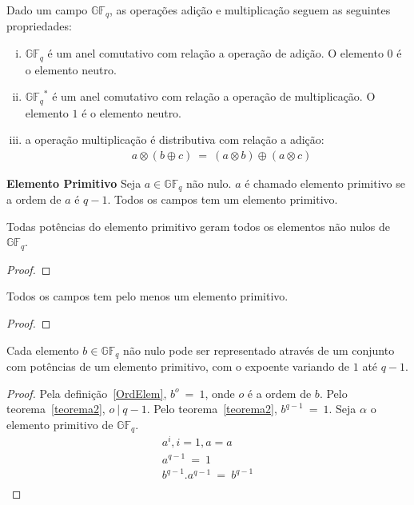 \begin{definition} 
Dado um campo $\mathbb{GF}_q$, as operações adição e multiplicação seguem as seguintes propriedades:
\begin{enumerate}[(i)]
   \item $\mathbb{GF}_q$ é um anel comutativo com relação a operação de adição. O elemento $0$ é o elemento neutro.
   \item ${\mathbb{GF}_q}^*$ é um anel comutativo com relação a operação de multiplicação. O elemento $1$ é o elemento neutro.
   \item a operação multiplicação é distributiva com relação a adição:
      \begin{align*}
         & a \otimes (b \oplus c)\ =\ (a \otimes b) \oplus (a \otimes c)
      \end{align*}
\end{enumerate}
\end{definition}

\begin{definition} {\bf Elemento Primitivo} \label{ElemPrim}  Seja $a \in \mathbb{GF}_q$ não nulo. $a$ é chamado elemento primitivo se a ordem de $a$ é $q-1$. Todos os campos tem um elemento primitivo.
\end{definition}

\begin{proposition} Todas potências do elemento primitivo geram todos os elementos não nulos de $\mathbb{GF}_q$. 
\end{proposition}

\begin{proof}
\end{proof}

\begin{proposition} Todos os campos tem pelo menos um elemento primitivo.
\end{proposition}

\begin{proof}
\end{proof}

\begin{proposition}  Cada elemento $b \in \mathbb{GF}_q$ não nulo pode ser representado através de um conjunto com potências de um elemento primitivo, com o expoente variando de $1$ até $q-1$.
\end{proposition}

\begin{proof}
Pela definição~\ref{OrdElem}, $b^o\ =\ 1$, onde $o$ é a ordem de $b$. Pelo teorema~\ref{teorema2}, $o\ |\ q-1$. Pelo teorema~\ref{teorema2}, $b^{q-1}\ =\ 1$. Seja $\alpha$ o elemento primitivo de $\mathbb{GF}_q$. 
$$
\begin{array}{cl}
a^i, i = 1, a = a\\
a^{q-1}\ =\ 1\\
b^{q-1}.a^{q-1}\ =\ b^{q-1}\\
\end{array}
$$
\end{proof}

